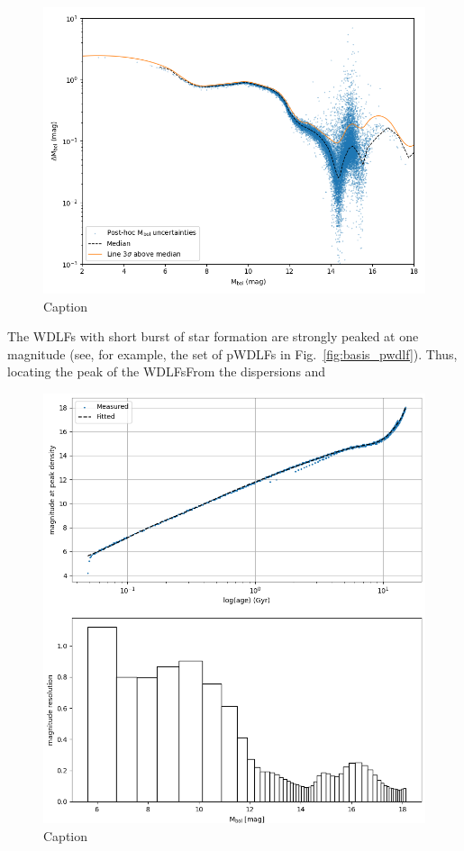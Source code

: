 \documentclass[fleqn,usenatbib]{mnras}
\begin{document}
\begin{figure}
    \includegraphics[width=\columnwidth]{figures/fig_03_mbol_sigma.png}
    \caption{Caption}
    \label{fig:mbol_sigma}
\end{figure}

The WDLFs with short burst of star formation are strongly peaked at one
magnitude (see, for example, the set of pWDLFs in Fig.~\ref{fig:basis_pwdlf}).
Thus, locating the peak of the WDLFsFrom the dispersions and 

\begin{figure}
    \includegraphics[width=\columnwidth]{figures/fig_04_magnitude_resoltuion.png}
    \caption{Caption}
    \label{fig:magnitude_resolution}
\end{figure}
\end{document}
